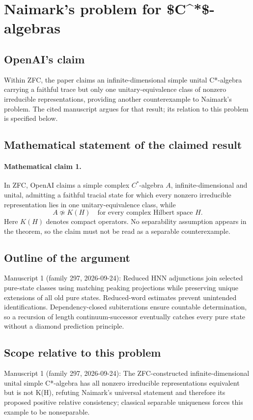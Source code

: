 \documentclass[11pt]{article}
\begin{document}
\section*{Naimark's problem for \$C\textasciicircum{}*\$-algebras}

\subsection{OpenAI's claim}
Within ZFC, the paper claims an infinite-dimensional simple unital C*-algebra carrying a faithful trace but only one unitary-equivalence class of nonzero irreducible representations, providing another counterexample to Naimark's problem. The cited manuscript argues for that result; its relation to this problem is specified below.

\subsection{Mathematical statement of the claimed result}
\paragraph{Mathematical claim 1.} In ZFC, OpenAI claims a simple complex $C^*$-algebra $A$, infinite-dimensional and unital, admitting a faithful tracial state for which every nonzero irreducible representation lies in one unitary-equivalence class, while
\[
A\not\simeq K(H)\quad\text{for every complex Hilbert space }H.
\]
Here $K(H)$ denotes compact operators. No separability assumption appears in the theorem, so the claim must not be read as a separable counterexample.

\subsection{Outline of the argument}
Manuscript 1 (family 297, 2026-09-24): Reduced HNN adjunctions join selected pure-state classes using matching peaking projections while preserving unique extensions of all old pure states. Reduced-word estimates prevent unintended identifications. Dependency-closed subiterations ensure countable determination, so a recursion of length continuum-successor eventually catches every pure state without a diamond prediction principle.

\subsection{Scope relative to this problem}
Manuscript 1 (family 297, 2026-09-24): The ZFC-constructed infinite-dimensional unital simple C*-algebra has all nonzero irreducible representations equivalent but is not K(H), refuting Naimark’s universal statement and therefore its proposed positive relative consistency; classical separable uniqueness forces this example to be nonseparable.
\end{document}
